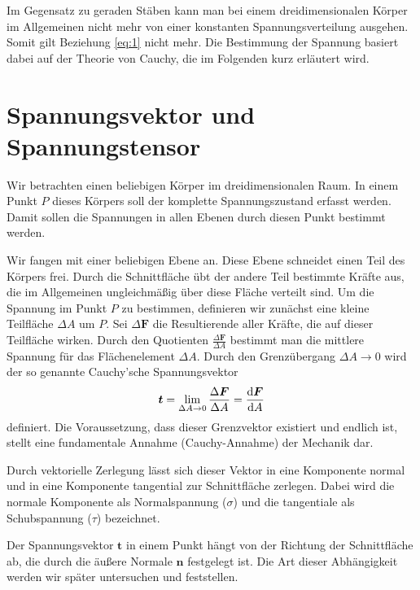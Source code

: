 \documentclass{lecture}
\begin{document}
    Im Gegensatz zu geraden Stäben kann man bei einem dreidimensionalen Körper im Allgemeinen nicht mehr von einer konstanten Spannungsverteilung ausgehen.
    Somit gilt Beziehung \eqref{eq:1} nicht mehr.
    Die Bestimmung der Spannung basiert dabei auf der Theorie von Cauchy, die im Folgenden kurz erläutert wird.


    \section*{Spannungsvektor und Spannungstensor}

    Wir betrachten einen beliebigen Körper im dreidimensionalen Raum.
    In einem Punkt \(P\) dieses Körpers soll der komplette Spannungszustand erfasst werden.
    Damit sollen die Spannungen in allen Ebenen durch diesen Punkt bestimmt werden.

    Wir fangen mit einer beliebigen Ebene an.
    Diese Ebene schneidet einen Teil des Körpers frei.
    Durch die Schnittfläche übt der andere Teil bestimmte Kräfte aus, die im Allgemeinen ungleichmäßig über diese Fläche verteilt sind.
    Um die Spannung im Punkt \(P\) zu bestimmen, definieren wir zunächst eine kleine Teilfläche \(\Delta A\) um \(P\).
    Sei \(\Delta\bm{F}\) die Resultierende aller Kräfte, die auf dieser Teilfläche wirken.
    Durch den Quotienten \(\frac{\Delta\bm{F}}{\Delta A}\) bestimmt man die mittlere Spannung für das Flächenelement \(\Delta A\).
    Durch den Grenzübergang \(\Delta A \to 0\) wird der so genannte Cauchy'sche Spannungsvektor
    \begin{equation}\label{eq:2}
        \bm{t} = \lim_{\Delta A \to 0}\frac{\Delta\bm{F}}{\Delta A} = \frac{\mathop{\mathrm{d}\!}\bm{F}}{\mathop{\mathrm{d}\!} A}
    \end{equation}
    definiert.
    Die Voraussetzung, dass dieser Grenzvektor existiert und endlich ist, stellt eine fundamentale Annahme (Cauchy-Annahme) der Mechanik dar.

    Durch vektorielle Zerlegung lässt sich dieser Vektor in eine Komponente normal und in eine Komponente tangential zur Schnittfläche zerlegen.
    Dabei wird die normale Komponente als Normalspannung (\(\sigma\)) und die tangentiale als Schubspannung (\(\tau\)) bezeichnet.

    Der Spannungsvektor \(\bm{t}\) in einem Punkt hängt von der Richtung der Schnittfläche ab, die durch die äußere Normale \(\bm{n}\) festgelegt ist.
    Die Art dieser Abhängigkeit werden wir später untersuchen und feststellen.
\end{document}
